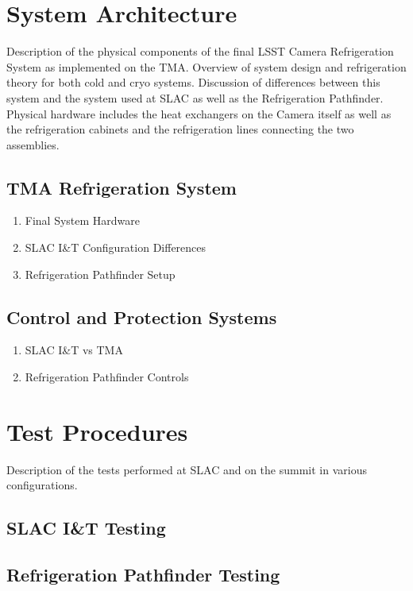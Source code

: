 \section{System Architecture} 

Description of the physical components of the final LSST Camera Refrigeration System as implemented on the TMA. Overview of system design and refrigeration theory for both cold and cryo systems. Discussion of differences between this system and the system used at SLAC as well as the Refrigeration Pathfinder. Physical hardware includes the heat exchangers on the Camera itself as well as the refrigeration cabinets and the refrigeration lines connecting the two assemblies.

\subsection{TMA Refrigeration System} 
	\begin{enumerate}
		\item Final System Hardware
		\item SLAC I\&T Configuration Differences 
		\item Refrigeration Pathfinder Setup
	\end{enumerate}

\subsection{Control and Protection Systems} 
\begin{enumerate}
	\item SLAC I\&T vs TMA 
	\item Refrigeration Pathfinder Controls
\end{enumerate}

\vspace{5mm}
\section{Test Procedures} 

Description of the tests performed at SLAC and on the summit in various configurations.

\subsection{SLAC I\&T Testing}
\subsection{Refrigeration Pathfinder Testing}
